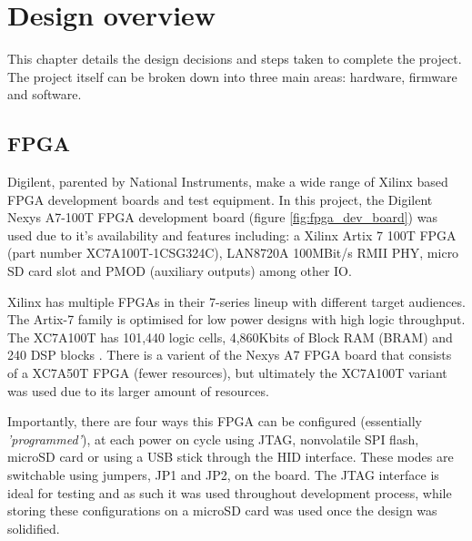 
\chapter[Design overview]{Design overview}
\label{chap:methodology}	%
\pagestyle{headings}

This chapter details the design decisions and steps taken to complete the project. The project itself can be broken down into three main areas: hardware, firmware and software. 


\section{FPGA}
Digilent, parented by National Instruments, make a wide range of Xilinx based FPGA development boards and test equipment. In this project, the Digilent Nexys A7-100T FPGA development board (figure \ref{fig:fpga_dev_board}) was used due to it's availability and features including: a Xilinx Artix 7 100T FPGA (part number XC7A100T-1CSG324C), LAN8720A 100MBit/s RMII PHY, micro SD card slot and PMOD (auxiliary outputs) among other IO. 

Xilinx has multiple FPGAs in their 7-series lineup with different target audiences. The Artix-7 family is optimised for low power designs with high logic throughput. The XC7A100T has 101,440 logic cells, 4,860Kbits of Block RAM (BRAM) and 240 DSP blocks \cite{Xilinx7SeriesDatasheet}. There is a varient of the Nexys A7 FPGA board that consists of a XC7A50T FPGA (fewer resources), but ultimately the XC7A100T variant was used due to its larger amount of resources.  

Importantly, there are four ways this FPGA can be configured (essentially \textit{'programmed'}), at each power on cycle using JTAG, nonvolatile SPI flash, microSD card or using a USB stick through the HID interface. These modes are switchable using jumpers, JP1 and JP2, on the board. The JTAG interface is ideal for testing and as such it was used throughout development process, while storing these configurations on a microSD card was used once the design was solidified. 

